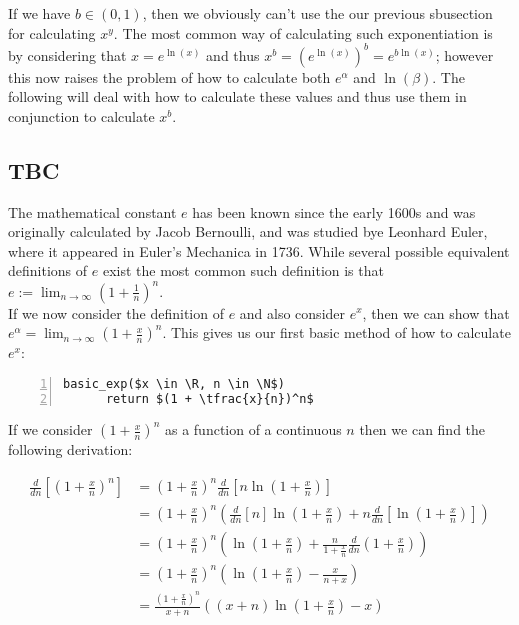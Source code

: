 If we have \(b \in (0, 1)\), then we obviously can't use the our previous sbusection for calculating \(x^y\). The most common way of calculating such exponentiation is by considering that \(x = e^{\ln(x)}\) and thus \(x^b = (e^{\ln(x)})^b = e^{b\ln(x)}\); however this now raises the problem of how to calculate both \(e^\alpha\) and \(\ln(\beta)\). The following will deal with how to calculate these values and thus use them in conjunction to calculate \(x^b\).\\

\subsection{TBC}

The mathematical constant \(e\) has been known since the early 1600s and was originally calculated by Jacob Bernoulli, and was studied bye Leonhard Euler, where it appeared in Euler's Mechanica in 1736. While several possible equivalent definitions of \(e\) exist the most common such definition is that \(e := \lim_{n \to \infty}(1 + \tfrac{1}{n})^n\).\\

If we now consider the definition of \(e\) and also consider \(e^x\), then we can show that \(e^\alpha = \lim_{n\to\infty}(1+\tfrac{x}{n})^n\). This gives us our first basic method of how to calculate \(e^x\):

\begin{lstlisting}[numbers=left,frame=single,mathescape,caption={Baisc Method for calculating \(e^\alpha\)},label={PCD_"basic exp"}]
  basic_exp($x \in \R, n \in \N$)
      return $(1 + \tfrac{x}{n})^n$
\end{lstlisting}

If we consider \((1+\tfrac{x}{n})^n\) as a function of a continuous \(n\) then we can find the following derivation:

\begin{align*}
	\frac{d}{dn}\left[(1 + \frac{x}{n})^n\right]
		&= (1+\frac{x}{n})^n\frac{d}{dn}\left[n\ln(1+\frac{x}{n})\right]\\
	&= (1+\frac{x}{n})^n(\frac{d}{dn}[n]\ln(1+\frac{x}{n}) 
		+ n\frac{d}{dn}\left[\ln(1+\frac{x}{n})\right])\\
	&=(1+\frac{x}{n})^n(\ln(1+\frac{x}{n}) 
		+ \frac{n}{1 + \frac{x}{n}}\frac{d}{dn}(1 + \frac{x}{n}))\\
	&=(1+\frac{x}{n})^n(\ln(1+\frac{x}{n}) - \frac{x}{n + x})\\
	&=\frac{(1+\frac{x}{n})^n}{x + n}((x + n)\ln(1 + \frac{x}{n}) - x)
\end{align*}

